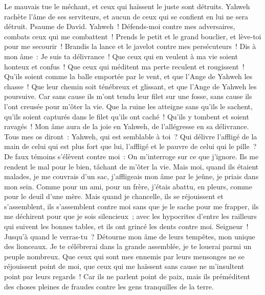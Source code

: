 \begin{multicols}{2}
 Le mauvais tue le méchant, et ceux qui haïssent le juste sont détruits.
 Yahweh rachète l'âme de ses serviteurs, et aucun de ceux qui se confient en lui ne sera détruit.
\VerseOne{}Psaume de David. Yahweh~! Défends-moi contre mes adversaires, combats ceux qui me combattent~!
Prends le petit et le grand bouclier, et lève-toi pour me secourir~!
Brandis la lance et le javelot contre mes persécuteurs~! Dis à mon âme~: Je suis ta délivrance~!
Que ceux qui en veulent à ma vie soient honteux et confus~! Que ceux qui méditent ma perte reculent et rougissent~!
Qu'ils soient comme la balle emportée par le vent, et que l'Ange de Yahweh les chasse~!
Que leur chemin soit ténébreux et glissant, et que l'Ange de Yahweh les poursuive.
Car sans cause ils m'ont tendu leur filet sur une fosse, sans cause ils l'ont creusée pour m'ôter la vie.
Que la ruine les atteigne sans qu'ils le sachent, qu'ils soient capturés dans le filet qu'ils ont caché~! Qu'ils y tombent et soient ravagés~!
Mon âme aura de la joie en Yahweh, de l'allégresse en sa délivrance.
Tous mes os diront~: Yahweh, qui est semblable à toi~? Qui délivre l'affligé de la main de celui qui est plus fort que lui, l'affligé et le pauvre de celui qui le pille~?
De faux témoins s'élèvent contre moi~: On m'interroge sur ce que j'ignore.
Ils me rendent le mal pour le bien, tâchant de m'ôter la vie.
Mais moi, quand ils étaient malades, je me couvrais d'un sac, j'affligeais mon âme par le jeûne, je priais dans mon sein.
Comme pour un ami, pour un frère, j'étais abattu, en pleurs, comme pour le deuil d'une mère.
Mais quand je chancelle, ils se réjouissent et s'assemblent, ils s'assemblent contre moi sans que je le sache pour me frapper, ils me déchirent pour que je sois silencieux~;
avec les hypocrites d'entre les railleurs qui suivent les bonnes tables, et ils ont grincé les dents contre moi.
Seigneur~! Jusqu'à quand le verras-tu~? Détourne mon âme de leurs tempêtes, mon unique des lionceaux.
Je te célébrerai dans la grande assemblée, je te louerai parmi un peuple nombreux.
Que ceux qui sont mes ennemis par leurs mensonges ne se réjouissent point de moi, que ceux qui me haïssent sans cause ne m'insultent point par leurs regards~!
Car ils ne parlent point de paix, mais ils préméditent des choses pleines de fraudes contre les gens tranquilles de la terre.

\end{multicols}
